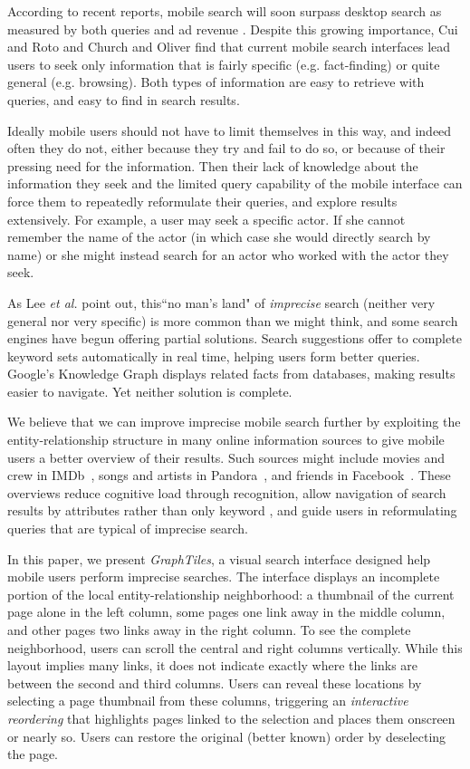 According to recent reports, mobile search will soon surpass desktop search as measured by both queries and ad revenue \cite{MobileQueries}\cite{MobileRevenue}. Despite this growing importance, Cui and Roto \cite{Cui:2008} and Church and Oliver \cite{Church:2011} find that current mobile search interfaces lead users to seek only information that is fairly specific (e.g. fact-finding) or quite general (e.g. browsing). Both types of information are easy to retrieve with queries, and easy to find in search results.

Ideally mobile users should not have to limit themselves in this way, and indeed often they do not, either because they try and fail to do so, or because of their pressing need for the information. Then their lack of knowledge about the information they seek and the limited query capability of the mobile interface \cite{Kamvar:2009} can force them to repeatedly reformulate their queries, and explore results extensively. For example, a user may seek a specific actor. If she cannot remember the name of the actor (in which case she would directly search by name) or she might instead search for an actor who worked with the actor they seek.

As Lee \textit{et al.} \cite{Lee:2012} point out, this``no man's land" of \textit{imprecise} search (neither very general nor very specific) is more common than we might think, and some search engines have begun offering partial solutions. Search suggestions offer to complete keyword sets automatically in real time, helping users form better queries. Google's Knowledge Graph displays related facts from databases, making results easier to navigate. Yet neither solution is complete.

We believe that we can improve imprecise mobile search further by exploiting the entity-relationship structure in many online information sources to give mobile users a better overview of their results. Such sources might include movies and crew in IMDb~\cite{imdb}, songs and artists in Pandora~\cite{pandora}, and friends in Facebook~\cite{Facebook}. These overviews reduce cognitive load through recognition, allow navigation of search results by attributes rather than only keyword \cite{Hearst:2002}, and guide users in reformulating queries that are typical of imprecise search.

In this paper, we present \textit{GraphTiles}, a visual search interface designed help mobile users perform imprecise searches. The interface displays an incomplete portion of the local entity-relationship neighborhood: a thumbnail of the current page alone in the left column, some pages one link away in the middle column, and other pages two links away in the right column. To see the complete neighborhood, users can scroll the central and right columns vertically. While this layout implies many links, it does not indicate exactly where the links are between the second and third columns. Users can reveal these locations by selecting a page thumbnail from these columns, triggering an \textit{interactive reordering} that highlights pages linked to the selection and places them onscreen or nearly so. Users can restore the original (better known) order by deselecting the page.